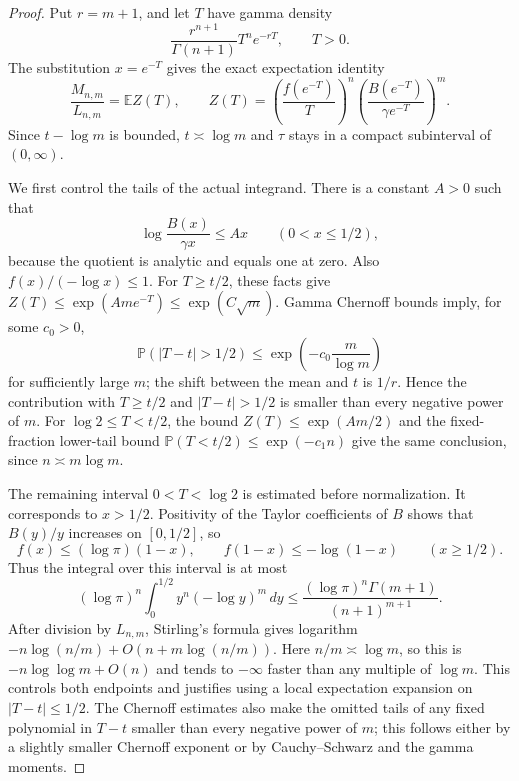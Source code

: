 \begin{proof}
Put $r=m+1$, and let $T$ have gamma density
\[
 \frac{r^{n+1}}{\Gamma(n+1)}T^n e^{-rT},\qquad T>0.
\]
The substitution $x=e^{-T}$ gives the exact expectation identity
\begin{equation}\label{cont26:joint:eq:gamma-expectation}
 \frac{M_{n,m}}{L_{n,m}}=\mathbb E Z(T),\qquad
 Z(T)=\left(\frac{f(e^{-T})}{T}\right)^n
       \left(\frac{B(e^{-T})}{\gamma e^{-T}}\right)^m.
\end{equation}
Since $t-\log m$ is bounded, $t\asymp\log m$ and $\tau$ stays in
a compact subinterval of $(0,\infty)$.

We first control the tails of the actual integrand.  There is a
constant $A>0$ such that
\[
 \log\frac{B(x)}{\gamma x}\le Ax\qquad(0<x\le1/2),
\]
because the quotient is analytic and equals one at zero.
Also $f(x)/(-\log x)\le1$.
For $T\ge t/2$, these facts give
$Z(T)\le\exp(A m e^{-T})\le\exp(C\sqrt m)$.
Gamma Chernoff bounds imply, for some $c_0>0$,
\[
 \mathbb P(|T-t|>1/2)\le
 \exp\left(-c_0\frac m{\log m}\right)
\]
for sufficiently large $m$; the shift between the mean and $t$ is
$1/r$.  Hence the contribution with $T\ge t/2$ and $|T-t|>1/2$
is smaller than every negative power of $m$.
For $\log2\le T<t/2$, the bound
$Z(T)\le\exp(A m/2)$ and the fixed-fraction lower-tail bound
$\mathbb P(T<t/2)\le\exp(-c_1 n)$ give the same conclusion,
since $n\asymp m\log m$.

The remaining interval $0<T<\log2$ is estimated before normalization.
It corresponds to $x>1/2$.  Positivity of the Taylor coefficients of
$B$ shows that $B(y)/y$ increases on $[0,1/2]$, so
\[
 f(x)\le(\log\pi)(1-x),\qquad
 f(1-x)\le-\log(1-x)\qquad(x\ge1/2).
\]
Thus the integral over this interval is at most
\begin{equation}\label{cont26:joint:eq:opposite-tail}
 (\log\pi)^n\int_0^{1/2}y^n(-\log y)^m\,dy
 \le\frac{(\log\pi)^n\Gamma(m+1)}{(n+1)^{m+1}}.
\end{equation}
After division by $L_{n,m}$, Stirling's formula gives logarithm
$-n\log(n/m)+O(n+m\log(n/m))$.
Here $n/m\asymp\log m$, so this is
$-n\log\log m+O(n)$ and tends to $-\infty$ faster than
any multiple of $\log m$.  This controls both endpoints and
justifies using a local expectation expansion on $|T-t|\le1/2$.
The Chernoff estimates also make the omitted tails of any fixed
polynomial in $T-t$ smaller than every negative power of $m$;
this follows either by a slightly smaller Chernoff exponent or by
Cauchy--Schwarz and the gamma moments.


\end{proof}
